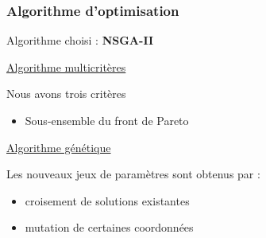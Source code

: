 \documentclass[xcolor={dvipsnames}]{beamer}
\begin{document}
\begin{frame}
 \frametitle{Algorithme d'optimisation}
 
 Algorithme choisi : \textbf{NSGA-II}
 
 \vspace{0.6cm} 
 
 \underline{Algorithme multicritères}
 \vspace{0.2cm}
 
 Nous avons trois critères
 \begin{itemize}
  \item  Sous-ensemble du front de Pareto
 \end{itemize}


 
 \vspace{0.6cm}
 \pause
 \underline{Algorithme génétique}
 \vspace{0.2cm}
 
 Les nouveaux jeux de paramètres sont obtenus par :
 \begin{itemize}
  \item croisement de solutions existantes
  \item mutation de certaines coordonnées
 \end{itemize}

 
\end{frame}
\end{document}
